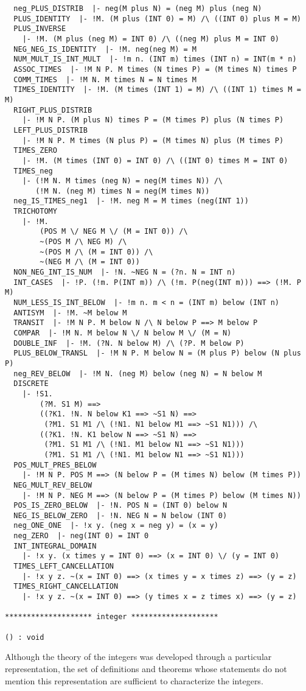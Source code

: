 \begin{verbatim}
  neg_PLUS_DISTRIB  |- neg(M plus N) = (neg M) plus (neg N)
  PLUS_IDENTITY  |- !M. (M plus (INT 0) = M) /\ ((INT 0) plus M = M)
  PLUS_INVERSE
    |- !M. (M plus (neg M) = INT 0) /\ ((neg M) plus M = INT 0)
  NEG_NEG_IS_IDENTITY  |- !M. neg(neg M) = M
  NUM_MULT_IS_INT_MULT  |- !m n. (INT m) times (INT n) = INT(m * n)
  ASSOC_TIMES  |- !M N P. M times (N times P) = (M times N) times P
  COMM_TIMES  |- !M N. M times N = N times M
  TIMES_IDENTITY  |- !M. (M times (INT 1) = M) /\ ((INT 1) times M = M)
  RIGHT_PLUS_DISTRIB
    |- !M N P. (M plus N) times P = (M times P) plus (N times P)
  LEFT_PLUS_DISTRIB
    |- !M N P. M times (N plus P) = (M times N) plus (M times P)
  TIMES_ZERO
    |- !M. (M times (INT 0) = INT 0) /\ ((INT 0) times M = INT 0)
  TIMES_neg
    |- (!M N. M times (neg N) = neg(M times N)) /\
       (!M N. (neg M) times N = neg(M times N))
  neg_IS_TIMES_neg1  |- !M. neg M = M times (neg(INT 1))
  TRICHOTOMY
    |- !M.
        (POS M \/ NEG M \/ (M = INT 0)) /\
        ~(POS M /\ NEG M) /\
        ~(POS M /\ (M = INT 0)) /\
        ~(NEG M /\ (M = INT 0))
  NON_NEG_INT_IS_NUM  |- !N. ~NEG N = (?n. N = INT n)
  INT_CASES  |- !P. (!m. P(INT m)) /\ (!m. P(neg(INT m))) ==> (!M. P M)
  NUM_LESS_IS_INT_BELOW  |- !m n. m < n = (INT m) below (INT n)
  ANTISYM  |- !M. ~M below M
  TRANSIT  |- !M N P. M below N /\ N below P ==> M below P
  COMPAR  |- !M N. M below N \/ N below M \/ (M = N)
  DOUBLE_INF  |- !M. (?N. N below M) /\ (?P. M below P)
  PLUS_BELOW_TRANSL  |- !M N P. M below N = (M plus P) below (N plus P)
  neg_REV_BELOW  |- !M N. (neg M) below (neg N) = N below M
  DISCRETE
    |- !S1.
        (?M. S1 M) ==>
        ((?K1. !N. N below K1 ==> ~S1 N) ==>
         (?M1. S1 M1 /\ (!N1. N1 below M1 ==> ~S1 N1))) /\
        ((?K1. !N. K1 below N ==> ~S1 N) ==>
         (?M1. S1 M1 /\ (!N1. M1 below N1 ==> ~S1 N1)))
         (?M1. S1 M1 /\ (!N1. M1 below N1 ==> ~S1 N1)))
  POS_MULT_PRES_BELOW
    |- !M N P. POS M ==> (N below P = (M times N) below (M times P))
  NEG_MULT_REV_BELOW
    |- !M N P. NEG M ==> (N below P = (M times P) below (M times N))
  POS_IS_ZERO_BELOW  |- !N. POS N = (INT 0) below N
  NEG_IS_BELOW_ZERO  |- !N. NEG N = N below (INT 0)
  neg_ONE_ONE  |- !x y. (neg x = neg y) = (x = y)
  neg_ZERO  |- neg(INT 0) = INT 0
  INT_INTEGRAL_DOMAIN
    |- !x y. (x times y = INT 0) ==> (x = INT 0) \/ (y = INT 0)
  TIMES_LEFT_CANCELLATION
    |- !x y z. ~(x = INT 0) ==> (x times y = x times z) ==> (y = z)
  TIMES_RIGHT_CANCELLATION
    |- !x y z. ~(x = INT 0) ==> (y times x = z times x) ==> (y = z)
  
******************** integer ********************

() : void

\end{verbatim}

Although the theory of the integers was developed through a particular
representation, the set of definitions and theorems whose statements
do not mention this representation are sufficient to characterize the
integers.
